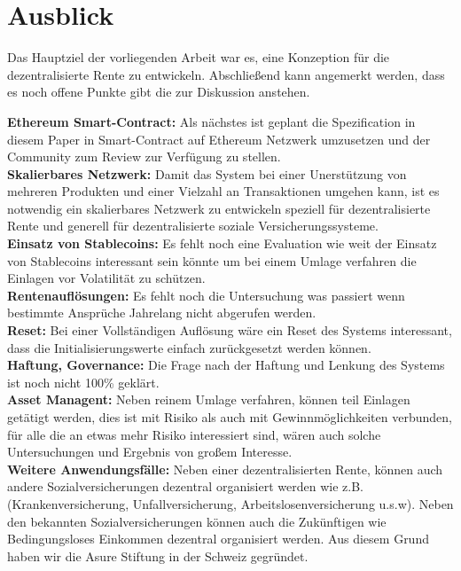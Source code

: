 \section{Ausblick}

Das Hauptziel der vorliegenden Arbeit war es, eine Konzeption für die dezentralisierte Rente zu entwickeln. Abschließend kann angemerkt werden, dass es noch offene Punkte gibt die zur Diskussion anstehen.


\textbf{Ethereum Smart-Contract:} Als nächstes ist geplant die Spezification in diesem Paper in Smart-Contract auf Ethereum Netzwerk umzusetzen und der Community zum Review zur Verfügung zu stellen.\\
\textbf{Skalierbares Netzwerk:} Damit das System bei einer Unerstützung von mehreren Produkten und einer Vielzahl an Transaktionen umgehen kann, ist es notwendig ein skalierbares Netzwerk zu entwickeln speziell für dezentralisierte Rente und generell für dezentralisierte soziale Versicherungssysteme.\\
\textbf{Einsatz von Stablecoins:} Es fehlt noch eine Evaluation wie weit der Einsatz von Stablecoins interessant sein könnte um bei einem Umlage verfahren die Einlagen vor Volatilität zu schützen.\\
\textbf{Rentenauflösungen:} Es fehlt noch die Untersuchung was passiert wenn bestimmte Ansprüche Jahrelang nicht abgerufen werden.\\
\textbf{Reset:} Bei einer Vollständigen Auflösung wäre ein Reset des Systems interessant, dass die Initialisierungswerte einfach zurückgesetzt werden können.\\
\textbf{Haftung, Governance:} Die Frage nach der Haftung und Lenkung des Systems ist noch nicht 100\% geklärt.\\
\textbf{Asset Managent:} Neben reinem Umlage verfahren, können teil Einlagen getätigt werden, dies ist mit Risiko als auch mit Gewinnmöglichkeiten verbunden, für alle die an etwas mehr Risiko interessiert sind, wären auch solche Untersuchungen und Ergebnis von großem Interesse.\\
\textbf{Weitere Anwendungsfälle:} Neben einer dezentralisierten Rente, können auch andere Sozialversicherungen dezentral organisiert werden wie z.B. (Krankenversicherung, Unfallversicherung, Arbeitslosenversicherung u.s.w). Neben den bekannten Sozialversicherungen können auch die Zukünftigen wie Bedingungsloses Einkommen dezentral organisiert werden. Aus diesem Grund haben wir die Asure Stiftung in der Schweiz gegründet.

